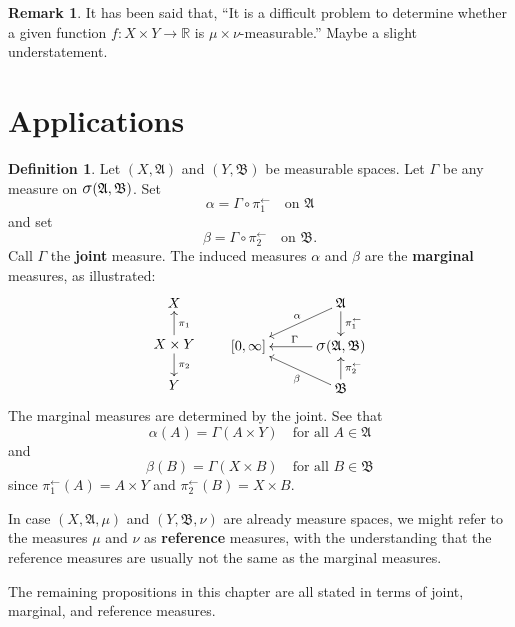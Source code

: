 \documentclass[
twoside=true,
paper=letter,
fontsize=9pt,
pagesize=auto,
leqno,
openany,
headsepline,
overfullrule,
]{scrbook}
\theoremstyle{plain}
\theoremstyle{plain}
\theoremstyle{definition}
\newtheorem{defn}[thm]{Definition}
\newtheorem{rmk}[thm]{Remark}
\theoremstyle{bfnoteitalic}
\theoremstyle{bfnoteroman}
\newcommand{\sigalg}[1]{\mathfrak{#1}}
\newcommand{\sagb}{\mathop{\hbox{\large{$\sigma$}}}\nolimits}
\newcommand{\preimage}[1]{#1^{\leftarrow}}
\newcommand{\R}{\mathbb{R}}
\newcommand{\sigmaalgebra}{\sigalg{A}}
\newcommand{\sigmaalgebraii}{\sigalg{B}}
\newcommand{\productsig}[2]{\sagb(#1,#2)}
\newcommand{\function}{f}
\newcommand{\measurespace}{X}
\newcommand{\measurespaceii}{Y}
\newcommand{\measmu}{\mu}
\newcommand{\measnu}{\nu}
\newcommand{\seti}{A}
\newcommand{\setii}{B}
\newcommand{\projectionone}{\pi_1}
\newcommand{\projectiontwo}{\pi_2}
\newcommand{\measonprod}{\Gamma}%
\newcommand{\marginalone}{\alpha}%
\newcommand{\marginaltwo}{\beta}%
\begin{document}
\begin{rmk}
It has been said that, ``It is a difficult problem to determine whether a given function 
$\function:\measurespace\times\measurespaceii\to\R$ is $\measmu\times\measnu$-measurable.''
Maybe a slight understatement.
\end{rmk}



\section{Applications}\label{product_integration_applications}





\begin{defn}\label{marginals}
Let $(\measurespace,\sigmaalgebra)$ and 
$(\measurespaceii,\sigmaalgebraii)$ be measurable spaces.
Let $\measonprod$ be any measure on
$\productsig{\sigmaalgebra}{\sigmaalgebraii}$.
Set
\[
\marginalone
=
\measonprod \circ \preimage{\projectionone}
\quad
\text{on }
\sigmaalgebra
\]
and set
\[
\marginaltwo
=
\measonprod \circ \preimage{\projectiontwo}
\quad
\text{on }
\sigmaalgebraii.
\]
Call $\measonprod$ the \textbf{joint} measure.
The induced measures
$\marginalone$ and $\marginaltwo$ are the \textbf{marginal} measures, as illustrated:
\[
\xymatrix@R=16pt@C=30pt{
\measurespace 
\\
\measurespace\times\measurespaceii 
\ar[u]_{\projectionone}
\ar[d]^{\projectiontwo} 
\\
\measurespaceii
}
\qquad
\xymatrix@R=16pt@C=30pt{ 
 & \sigmaalgebra 
 \ar[d]^-{\preimage{\projectionone}} 
 \ar[dl]_-{\marginalone} 
\\
[0,\infty] 
& \productsig{\sigmaalgebra}{\sigmaalgebraii} \ar[l]_{\measonprod}
\\
 & \sigmaalgebraii \ar[u]_-{\preimage{\projectiontwo}} 
 \ar[ul]^-{\marginaltwo}
\\
}
\]
The marginal measures are determined by the joint.
See that
\[
\marginalone(\seti)=\measonprod(\seti\times\measurespaceii)
\quad
\text{for all $\seti\in\sigmaalgebra$}
\]
and
\[
\marginaltwo(\setii)=\measonprod(\measurespace\times\setii)
\quad
\text{for all $\setii\in\sigmaalgebraii$}
\]
since
$\preimage{\projectionone}(\seti) = \seti\times\measurespaceii$
and
$\preimage{\projectiontwo}(\setii) = \measurespace\times\setii$.


In case  $(\measurespace,\sigmaalgebra,\measmu)$ and
$(\measurespaceii,\sigmaalgebraii,\measnu)$ are already measure spaces, we might refer to the measures
$\measmu$ and $\measnu$ as \textbf{reference} measures, with the understanding that the reference measures are usually not the same as the marginal measures.

The remaining propositions in this chapter are all stated in terms of joint, marginal, and reference measures.
\end{defn}
\end{document}
